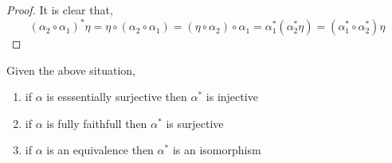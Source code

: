 \documentclass[12pt]{article}
\begin{document}
\begin{proof}
It is clear that,
\[ (\alpha_2 \circ \alpha_1)^* \eta = \eta \circ (\alpha_2 \circ \alpha_1) = (\eta \circ \alpha_2) \circ \alpha_1 = \alpha_1^* (\alpha_2^* \eta) = (\alpha_1^* \circ \alpha_2^*) \eta \]
\end{proof}

\begin{prop}
Given the above situation,
\begin{enumerate}
\item if $\alpha$ is esssentially surjective then $\alpha^*$ is injective
\item if $\alpha$ is fully faithfull then $\alpha^*$ is surjective
\item if $\alpha$ is an equivalence then $\alpha^*$ is an isomorphism
\end{enumerate}
\end{prop}
\end{document}
